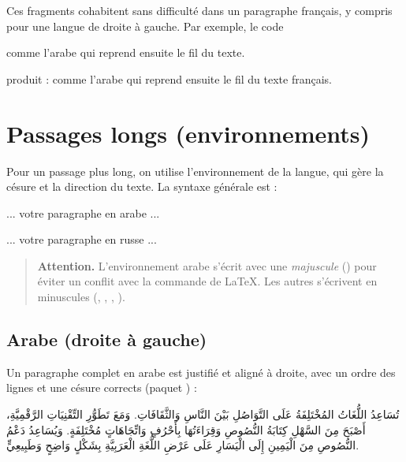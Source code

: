Ces fragments cohabitent sans difficulté dans un paragraphe français, y
compris pour une langue de droite à gauche. Par exemple, le code

\begin{latexcode}
comme l'arabe  qui reprend ensuite le fil du texte.
\end{latexcode}

\noindent produit : comme l'arabe  qui reprend ensuite le
fil du texte français.

\section{Passages longs (environnements)}

Pour un passage plus long, on utilise l'environnement de la langue, qui
gère la césure et la direction du texte. La syntaxe générale est :

\begin{latexcode}
\begin{Arabic}
  ... votre paragraphe en arabe ...
\end{Arabic}

\begin{russian}
  ... votre paragraphe en russe ...
\end{russian}
\end{latexcode}

\begin{quote}\small
\textbf{Attention.} L'environnement arabe s'écrit avec une \emph{majuscule}
() pour éviter un conflit avec la commande \code{\arabic} de
LaTeX. Les autres s'écrivent en minuscules (, ,
, ).
\end{quote}

\subsection{Arabe (droite à gauche)}

Un paragraphe complet en arabe est justifié et aligné à droite, avec un
ordre des lignes et une césure corrects (paquet ) :

\begin{Arabic}
تُسَاعِدُ اللُّغَاتُ المُخْتَلِفَةُ عَلَى التَّوَاصُلِ بَيْنَ النَّاسِ وَالثَّقَافَاتِ. وَمَعَ تَطَوُّرِ التِّقْنِيَاتِ الرَّقْمِيَّةِ، أَصْبَحَ مِنَ السَّهْلِ كِتَابَةُ النُّصُوصِ وَقِرَاءَتُهَا بِأَحْرُفٍ وَاتِّجَاهَاتٍ مُخْتَلِفَةٍ. وَيُسَاعِدُ دَعْمُ النُّصُوصِ مِنَ الْيَمِينِ إِلَى الْيَسَارِ عَلَى عَرْضِ اللُّغَةِ الْعَرَبِيَّةِ بِشَكْلٍ وَاضِحٍ وَطَبِيعِيٍّ.
\end{Arabic}

